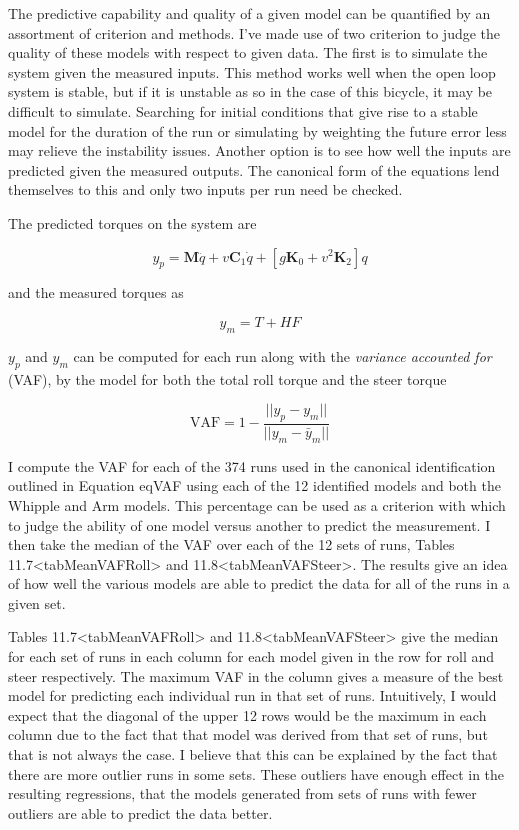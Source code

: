 \documentclass[a4paper]{article}
\begin{document}


The predictive capability and quality of a given model can be quantified
by an assortment of criterion and methods. I've made use of two
criterion to judge the quality of these models with respect to given
data. The first is to simulate the system given the measured inputs.
This method works well when the open loop system is stable, but if it is
unstable as so in the case of this bicycle, it may be difficult to
simulate. Searching for initial conditions that give rise to a stable
model for the duration of the run or simulating by weighting the future
error less may relieve the instability issues. Another option is to see
how well the inputs are predicted given the measured outputs. The
canonical form of the equations lend themselves to this and only two
inputs per run need be checked.

The predicted torques on the system are

\[y_p = \mathbf{M} \ddot{q} + v \mathbf{C}_1 \dot{q} + [g \mathbf{K}_0 + v^2
\mathbf{K}_2] q\]

and the measured torques as

\[y_m = T + H F\]

$y_p$ and $y_m$ can be computed for each run along with the
\emph{variance accounted for} (VAF), by the model for both the total
roll torque and the steer torque

\[\textrm{VAF} = 1 - \frac{\vert \vert y_p - y_m\vert \vert }{\vert \vert y_m - \bar{y}_m\vert \vert }\]

I compute the VAF for each of the 374 runs used in the canonical
identification outlined in Equation eqVAF using each of the 12
identified models and both the Whipple and Arm models. This percentage
can be used as a criterion with which to judge the ability of one model
versus another to predict the measurement. I then take the median of the
VAF over each of the 12 sets of runs, Tables
11.7\textless{}tabMeanVAFRoll\textgreater{} and
11.8\textless{}tabMeanVAFSteer\textgreater{}. The results give an idea
of how well the various models are able to predict the data for all of
the runs in a given set.

Tables 11.7\textless{}tabMeanVAFRoll\textgreater{} and
11.8\textless{}tabMeanVAFSteer\textgreater{} give the median for each
set of runs in each column for each model given in the row for roll and
steer respectively. The maximum VAF in the column gives a measure of the
best model for predicting each individual run in that set of runs.
Intuitively, I would expect that the diagonal of the upper 12 rows would
be the maximum in each column due to the fact that that model was
derived from that set of runs, but that is not always the case. I
believe that this can be explained by the fact that there are more
outlier runs in some sets. These outliers have enough effect in the
resulting regressions, that the models generated from sets of runs with
fewer outliers are able to predict the data better.
\end{document}
